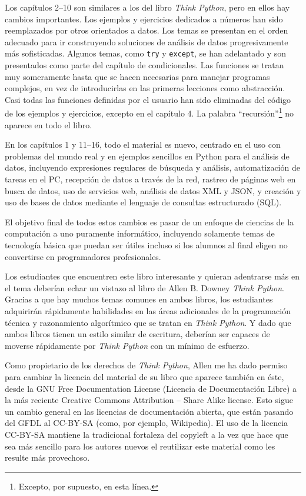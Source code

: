 Los capítulos 2--10 son similares a los del libro \emph{Think Python},
pero en ellos hay cambios importantes. Los ejemplos y ejercicios
dedicados a números han sido reemplazados por otros orientados a datos.
Los temas se presentan en el orden adecuado para ir construyendo soluciones
de análisis de datos progresivamente más sofisticadas.
Algunos temas, como {\tt try} y {\tt except}, se han adelantado
y son presentados como parte del capítulo de condicionales.
Las funciones se tratan muy someramente hasta que se hacen necesarias
para manejar programas complejos, en vez de introducirlas en las primeras
lecciones como abstracción. Casi todas las funciones definidas por el usuario
han sido eliminadas del código de los ejemplos y ejercicios, excepto en el capítulo 4.
La palabra ``recursión''\footnote{Excepto, por supuesto, en esta línea.}
no aparece en todo el libro.

En los capítulos 1 y 11--16, todo el material es nuevo, centrado en
el uso con problemas del mundo real y en ejemplos sencillos en Python para el
análisis de datos, incluyendo expresiones regulares de búsqueda y análisis,
automatización de tareas en el PC, recepción de datos a través de la red,
rastreo de páginas web en busca de datos,
uso de servicios web, análisis de datos XML y JSON, y creación y uso
de bases de datos mediante el lenguaje de consultas estructurado (SQL).

El objetivo final de todos estos cambios es pasar de un enfoque
de ciencias de la computación a uno puramente informático, incluyendo
solamente temas de tecnología básica que puedan
ser útiles incluso si los alumnos al final eligen no convertirse en
programadores profesionales.

Los estudiantes que encuentren este libro interesante y quieran adentrarse
más en el tema deberían echar un vistazo al libro de Allen B. Downey
\emph{Think Python}. Gracias a que hay muchos temas comunes en ambos libros,
los estudiantes adquirirán rápidamente habilidades en las áreas adicionales
de la programación técnica y razonamiento algorítmico que se tratan en
\emph{Think Python}.
Y dado que ambos libros tienen un estilo similar de escritura, deberían ser
capaces de moverse rápidamente por \emph{Think Python} con un mínimo de esfuerzo.

Como propietario de los derechos de \emph{Think Python},
Allen me ha dado permiso para cambiar la licencia
del material de su libro que aparece también en éste,
desde la
GNU Free Documentation License (Licencia de Documentación Libre)
a la más reciente
Creative Commons Attribution -- Share Alike license.
Esto sigue un cambio general en las licencias de documentación abierta,
que están pasando del GFDL al CC-BY-SA (como, por ejemplo, Wikipedia).
El uso de la licencia CC-BY-SA mantiene la tradicional fortaleza del copyleft
a la vez que hace que sea más sencillo para los autores nuevos
el reutilizar este material como les resulte más provechoso.

